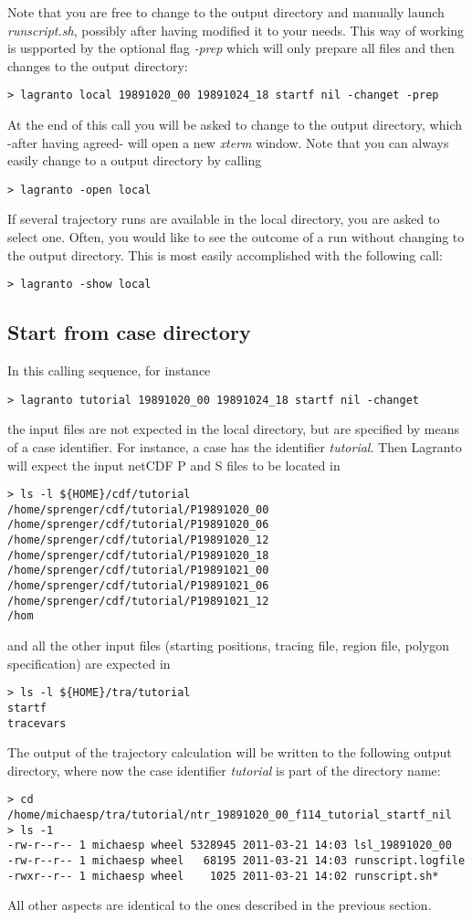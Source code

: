 \documentclass[a4paper,10pt]{article}
\begin{document}
\noindent
Note that you are free to change to the output directory and manually launch {\em runscript.sh}, possibly after having modified it to your needs. This way of working is uspported by the optional flag {\em -prep} which will only prepare all files and then changes to the output directory:
\begin{verbatim}
> lagranto local 19891020_00 19891024_18 startf nil -changet -prep
\end{verbatim}
At the end of this call you will be asked to change to the output directory, which -after having agreed- will open a new {\em xterm} window. Note that you can always easily change to a output directory by calling
\begin{verbatim}
> lagranto -open local 
\end{verbatim}
If several trajectory runs are available in the local directory, you are asked to select one. Often, you would like to see the outcome of a run without changing to the output directory. This is most easily accomplished with the following call:
\begin{verbatim}
> lagranto -show local 
\end{verbatim}

\subsection{Start from case directory}

In this calling sequence, for instance
\begin{verbatim}
> lagranto tutorial 19891020_00 19891024_18 startf nil -changet
\end{verbatim}
the input files are not expected in the local directory, but are specified by means of a case identifier. For instance, a case has the identifier {\em tutorial}. Then Lagranto will expect the input netCDF P and S files to be located in
\begin{verbatim}
> ls -l ${HOME}/cdf/tutorial
/home/sprenger/cdf/tutorial/P19891020_00
/home/sprenger/cdf/tutorial/P19891020_06
/home/sprenger/cdf/tutorial/P19891020_12
/home/sprenger/cdf/tutorial/P19891020_18
/home/sprenger/cdf/tutorial/P19891021_00
/home/sprenger/cdf/tutorial/P19891021_06
/home/sprenger/cdf/tutorial/P19891021_12
/hom
\end{verbatim}
and all the other input files (starting positions, tracing file, region file, polygon specification) are expected in 
\begin{verbatim}
> ls -l ${HOME}/tra/tutorial
startf
tracevars
\end{verbatim}
The output of the trajectory calculation will be written to the following output directory, where now the case identifier {\em tutorial} is part of the directory name:
\begin{verbatim}
> cd /home/michaesp/tra/tutorial/ntr_19891020_00_f114_tutorial_startf_nil
> ls -1
-rw-r--r-- 1 michaesp wheel 5328945 2011-03-21 14:03 lsl_19891020_00
-rw-r--r-- 1 michaesp wheel   68195 2011-03-21 14:03 runscript.logfile
-rwxr--r-- 1 michaesp wheel    1025 2011-03-21 14:02 runscript.sh*
\end{verbatim}
All other aspects are identical to the ones described in the previous section. 
\end{document}
